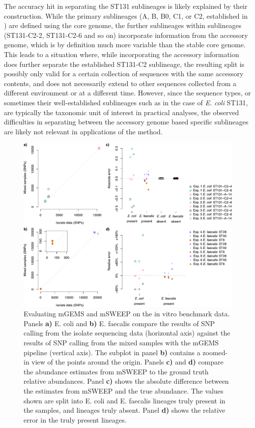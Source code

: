 \documentclass[officiallayout]{tktla}
\let\svthefootnote\thefootnote
\begin{document}
The accuracy hit in separating the ST131 sublineages is likely
explained by their construction. While the primary sublineages (A, B,
B0, C1, or C2, established in \citep{kallonen2017systematic}) are
defined using the core genome, the further sublineages within
sublineages (ST131-C2-2, ST131-C2-6 and so on) incorporate information
from the accessory genome, which is by definition much more variable
than the stable core genome. This leads to a situation where, while
incorporating the accessory information does further separate the
established ST131-C2 sublineage, the resulting split is possibly only
valid for a certain collection of sequences with the same accessory
contents, and does not necessarily extend to other sequences collected
from a different environment or at a different time. However, since
the sequence types, or sometimes their well-established sublineages
such as in the case of \textit{E. coli} ST131, are typically the
taxonomic unit of interest in practical analyses, the observed
difficulties in separating between the accessory genome based specific
sublineages are likely not relevant in applications of the method.
\vfill
\addtocounter{footnote}{-1}\let\thefootnote\svthefootnote
\begin{figure}[!ht]
  \centering
  \includegraphics[height=0.70\textheight,width=\textwidth,keepaspectratio]{img/reproduced/MGen2021_mGEMS_Figure_2_rev.pdf}
  \caption{Evaluating mGEMS and mSWEEP on the in vitro benchmark
    data. Panels \textbf{a)} E. coli and \textbf{b)} E. faecalis compare the results
    of SNP calling from the isolate sequencing data (horizontal axis)
    against the results of SNP calling from the mixed samples with the
    mGEMS pipeline (vertical axis). The subplot in panel \textbf{b)} contains
    a zoomed-in view of the points around the origin. Panels \textbf{c)} and
    \textbf{d)} compare the abundance estimates from mSWEEP to the ground
    truth relative abundances. Panel \textbf{c)} shows the absolute difference
    between the estimates from mSWEEP and the true abundance. The
    values shown are split into E. coli and E. faecalis lineages truly
    present in the samples, and lineages truly absent. Panel \textbf{d)} shows
    the relative error in the truly present lineages.}
    \label{fig:mgems-in-vitro-benchmark}
\end{figure}
\end{document}
